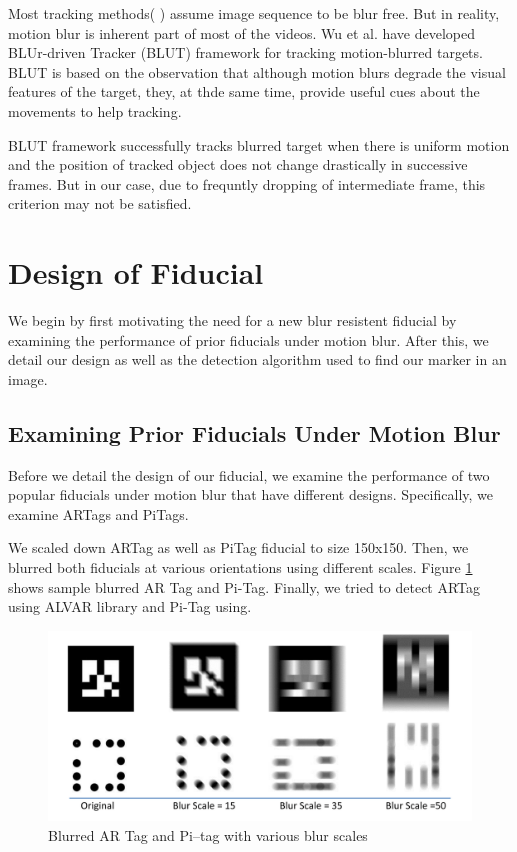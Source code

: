 \documentclass[runningheads]{llncs}
\begin{document}
Most tracking methods( \cite{Ross:2008} \cite{Wu:2009} \cite{Perez02}
\cite{Mei:2009} ) assume image sequence to be blur free. But in reality, motion
blur is inherent part of most of the videos. Wu et al.\cite{Wu:2011} have
developed BLUr-driven Tracker (BLUT) framework for tracking motion-blurred
targets. BLUT is based on the observation that although motion blurs degrade
the visual features of the target, they, at thde same time, provide useful cues
about the movements to help tracking.

BLUT framework successfully tracks blurred target when there is uniform motion
and the position of tracked object does not change drastically in successive
frames. But in our case, due to frequntly dropping of intermediate frame, this
criterion may not be satisfied.

\section{Design of Fiducial}

We begin by first motivating the need for a new blur resistent fiducial by examining
the performance of prior fiducials under motion blur.  After this, we detail
our design as well as the detection algorithm used to find our marker in an image.

\subsection{Examining Prior Fiducials Under Motion Blur}

Before we detail the design of our fiducial, we examine the performance of two
popular fiducials under motion blur that have different designs. Specifically,
we examine ARTags\cite{Fiala05} and PiTags\cite{Pitag13}.

We scaled down ARTag as well as PiTag fiducial to size 150x150.  Then, we
blurred both fiducials at various orientations using different scales.
Figure \ref{fig:artag_pitag} shows sample blurred AR Tag and Pi-Tag. Finally, we
tried to detect ARTag using ALVAR library\cite{alvar} and Pi-Tag using\cite{ros_pitag}.

\begin{figure}
\centering
\includegraphics[width=\linewidth]{artag_pitag.pdf}
\caption{Blurred AR Tag and Pi--tag with various blur scales}
\label{fig:artag_pitag}
\end{figure}
\end{document}
